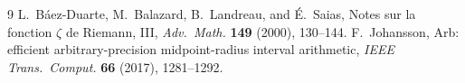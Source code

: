 \documentclass[11pt,a4paper]{article}
\theoremstyle{definition}
\begin{document}
\begin{thebibliography}{9}
 L.~B\'aez-Duarte, M.~Balazard, B.~Landreau, and \'E.~Saias, Notes sur la fonction $\zeta$ de Riemann, III, \emph{Adv.\ Math.} \textbf{149} (2000), 130--144.
 F.~Johansson, Arb: efficient arbitrary-precision midpoint-radius interval arithmetic, \emph{IEEE Trans.\ Comput.} \textbf{66} (2017), 1281--1292.
\end{thebibliography}
\end{document}
